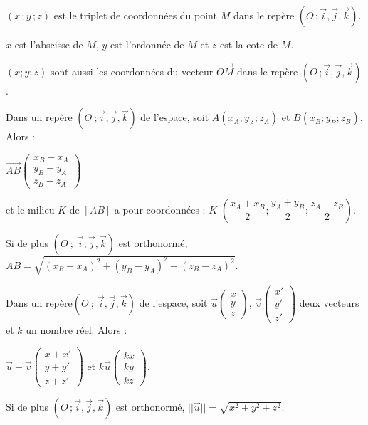 \documentclass{cornouaille}
\begin{document}
\begin{definition}
  $(x\,;y\,;z)$ est le triplet de coordonnées du
  point $M$ dans le repère $(O\,;\vec{i},\vec{j},\vec{k})$.

  $x$ est l'abscisse de $M$, $y$ est l'ordonnée de $M$ et $z$ est la
  cote de $M$.  

  $(x;y;z)$ sont aussi les coordonnées du vecteur
  $\overrightarrow{OM}$ dans le repère
  $(O\,;\vec{i},\vec{j},\vec{k})$.
\end{definition}
 
\begin{proprietes}
  Dans un repère $(O\ ;\vec{i},\vec{j},\vec{k})$ de l'espace,
  soit $A(x_A;y_A;z_A)$  et $B(x_B;y_B;z_B)$.  Alors :

  $\overrightarrow{AB}\begin{pmatrix}x_B-x_A\\y_B-y_A\\z_B-z_A \end{pmatrix}$

  et le milieu $K$ de $[AB]$ a pour coordonnées :   $K$
  $(\dfrac{x_A+x_B}{2};\dfrac{y_A+y_B}{2} ;\dfrac{z_A+z_B}{2})$.

  

  Si de plus $(O\ ;\ \vec{i},\vec{j},\vec{k})$ est orthonormé,
  $AB=\sqrt{(x_B-x_A)^2+(y_B-y_A)^2+(z_B-z_A)^2}$.
\end{proprietes}

\begin{proprietes}
  Dans un repère$(O\ ;\ \vec{i},\vec{j},\vec{k})$ de l'espace,
  soit $\vec{u}\begin {pmatrix} x\\y\\z \end{pmatrix}$,
  $\vec{v}\begin {pmatrix} x'\\y'\\z' \end{pmatrix}$ deux vecteurs et
  $k$ un nombre réel. Alors :

  $\vec{u}+\vec{v} \begin {pmatrix} x+x'\\y+y'\\z+z' \end{pmatrix}$ et
  $k \vec{u} \begin {pmatrix} kx\\ky\\kz \end{pmatrix}$.

  Si de plus $(O\,;\vec{i},\vec{j},\vec{k})$ est orthonormé,
  $||\vec{u}||=\sqrt{x^2+y^2+z^2}$.
\end{proprietes}
\end{document}
